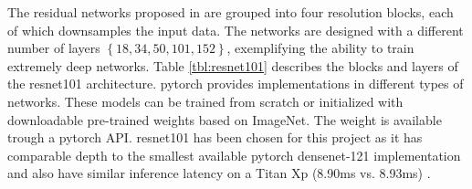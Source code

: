 The residual networks proposed in \cite{he_deep_2015} are grouped into four resolution blocks, each of which downsamples the input data. The networks are designed with a different number of layers $ \left\{18, 34, 50, 101, 152\right\} $, exemplifying the ability to train extremely deep networks. Table \ref{tbl:resnet101} describes the blocks and layers of the \gls{resnet}101 architecture. \gls{pytorch} provides implementations in different types of networks. These models can be trained from scratch or initialized with downloadable pre-trained weights based on ImageNet. The weight is available trough a \gls{pytorch} API. \gls{resnet}101 has been chosen for this project as it has comparable depth to the smallest available \gls{pytorch} \gls{densenet}-121 implementation and also have similar inference latency on a Titan Xp (8.90ms vs. 8.93ms) \cite{bianco_benchmark_2018}.

